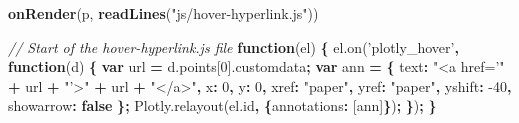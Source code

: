 \documentclass[
  12pt,
]{krantz}
\newenvironment{Shaded}{\begin{snugshade}}{\end{snugshade}}
\newcommand{\AttributeTok}[1]{\textcolor[rgb]{0.77,0.63,0.00}{#1}}
\newcommand{\CommentTok}[1]{\textcolor[rgb]{0.56,0.35,0.01}{\textit{#1}}}
\newcommand{\DataTypeTok}[1]{\textcolor[rgb]{0.13,0.29,0.53}{#1}}
\newcommand{\DecValTok}[1]{\textcolor[rgb]{0.00,0.00,0.81}{#1}}
\newcommand{\KeywordTok}[1]{\textcolor[rgb]{0.13,0.29,0.53}{\textbf{#1}}}
\newcommand{\NormalTok}[1]{#1}
\newcommand{\OperatorTok}[1]{\textcolor[rgb]{0.81,0.36,0.00}{\textbf{#1}}}
\newcommand{\StringTok}[1]{\textcolor[rgb]{0.31,0.60,0.02}{#1}}
\newcommand{\VariableTok}[1]{\textcolor[rgb]{0.00,0.00,0.00}{#1}}
\begin{document}

\begin{Shaded}
\begin{Highlighting}[]
\KeywordTok{onRender}\NormalTok{(p, }\KeywordTok{readLines}\NormalTok{(}\StringTok{"js/hover-hyperlink.js"}\NormalTok{))}
\end{Highlighting}
\end{Shaded}

\begin{Shaded}
\begin{Highlighting}[]
\CommentTok{// Start of the hover-hyperlink.js file}
\KeywordTok{function}\NormalTok{(el) }\OperatorTok{\{}
  \VariableTok{el}\NormalTok{.}\AttributeTok{on}\NormalTok{(}\StringTok{'plotly_hover'}\OperatorTok{,} \KeywordTok{function}\NormalTok{(d) }\OperatorTok{\{}
    \KeywordTok{var}\NormalTok{ url }\OperatorTok{=} \VariableTok{d}\NormalTok{.}\AttributeTok{points}\NormalTok{[}\DecValTok{0}\NormalTok{].}\AttributeTok{customdata}\OperatorTok{;}
    \KeywordTok{var}\NormalTok{ ann }\OperatorTok{=} \OperatorTok{\{}
      \DataTypeTok{text}\OperatorTok{:} \StringTok{"<a href='"} \OperatorTok{+}\NormalTok{ url }\OperatorTok{+} \StringTok{"'>"} \OperatorTok{+}\NormalTok{ url }\OperatorTok{+} \StringTok{"</a>"}\OperatorTok{,}
      \DataTypeTok{x}\OperatorTok{:} \DecValTok{0}\OperatorTok{,}
      \DataTypeTok{y}\OperatorTok{:} \DecValTok{0}\OperatorTok{,}
      \DataTypeTok{xref}\OperatorTok{:} \StringTok{"paper"}\OperatorTok{,}
      \DataTypeTok{yref}\OperatorTok{:} \StringTok{"paper"}\OperatorTok{,}
      \DataTypeTok{yshift}\OperatorTok{:} \DecValTok{-40}\OperatorTok{,}
      \DataTypeTok{showarrow}\OperatorTok{:} \KeywordTok{false}
    \OperatorTok{\};}
    \VariableTok{Plotly}\NormalTok{.}\AttributeTok{relayout}\NormalTok{(}\VariableTok{el}\NormalTok{.}\AttributeTok{id}\OperatorTok{,} \OperatorTok{\{}\DataTypeTok{annotations}\OperatorTok{:}\NormalTok{ [ann]}\OperatorTok{\}}\NormalTok{)}\OperatorTok{;}
 \OperatorTok{\}}\NormalTok{)}\OperatorTok{;}
\OperatorTok{\}}
\end{Highlighting}
\end{Shaded}
\end{document}

